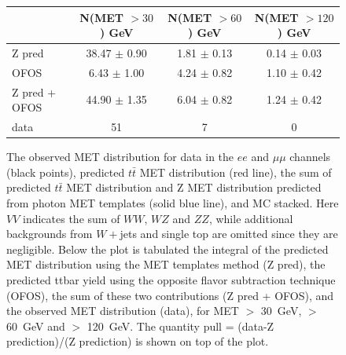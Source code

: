 \begin{figure}[hbtp]
  \begin{center}

	\medskip 

    \begin{tabular}{lccc}
\hline
                        &   N(MET $>30$)  GeV    &   N(MET $>60$)  GeV    &   N(MET $>120$) GeV   \\
\hline
              Z pred    &  38.47  $\pm$  0.90    &   1.81  $\pm$  0.13    &   0.14  $\pm$  0.03   \\
                OFOS    &   6.43  $\pm$  1.00    &   4.24  $\pm$  0.82    &   1.10  $\pm$  0.42   \\
\hline
       Z pred + OFOS    &  44.90  $\pm$  1.35    &   6.04  $\pm$  0.82    &   1.24  $\pm$  0.42   \\
\hline
                data    &                  51    &                   7    &                   0   \\
\hline
    \end{tabular}

    \caption{
      The observed MET distribution for data in the $ee$ and $\mu\mu$ channels (black points),
      predicted $t\bar{t}$ MET distribution (red line), the sum of predicted $t\bar{t}$ MET distribution and
      Z  MET  distribution  predicted  from photon  MET  templates
      (solid blue line),  and MC stacked. Here $VV$  indicates the sum
      of  $WW$,  $WZ$  and  $ZZ$, while  additional  backgrounds  from
      $W+$jets   and   single  top   are   omitted   since  they   are
      negligible.  Below the  plot is  tabulated the  integral  of the
      predicted  MET distribution  using the  MET templates  method (Z
      pred),  the  predicted ttbar  yield  using  the opposite  flavor
      subtraction  technique (OFOS), the  sum of  these two
      contributions (Z pred + OFOS), and the observed MET distribution
      (data), for  MET $>$ 30~GeV,  $>$ 60~GeV and $>$  120~GeV. The
      quantity pull  = (data-Z prediction)/(Z prediction)  is shown on
      top  of the  plot.  
    }
    \label{fig:pfmet_eemm}
  \end{center}
\end{figure}

